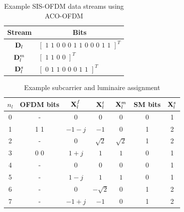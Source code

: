 \documentclass[12pt,letterpaper,onecolumn]{article} %
\newcommand{\vm}[1]{{\bf{#1}}}
\begin{document}
\setcounter{table}{0}
\newpage
\begin{table}[htp]
	\centering
		\begin{tabular}{|c|l|}
			\hline
			{\bf{Stream}}&\multicolumn{1}{|c|}{\bf{Bits}}\\
			\hline
			$\vm{D}_l$ & $\left[\text{ 1 1 0 0 0 1 1 0 0 0 1 1 }\right]^T $\\
			\hline
			$\vm{D}_l^m$ & $\left[\text{ 1 1 0 0 }\right]^T $\\
			\hline
			$\vm{D}_l^s$ & $\left[\text{ 0 1 1 0 0 0 1 1 }\right]^T $\\
			\hline
		\end{tabular}
	\caption{Example SIS-OFDM data streams using ACO-OFDM}
	\label{tabExBits}
\end{table}

\newpage
\begin{table}[htp]
	\centering
      \begin{tabular}{|c|c|c|c|c|c|c|}
			\hline
			{ $n_l$ }&{\bf{OFDM bits}}&$\vm{X}_l^f$&$\vm{X}^t_l$&$\vm{X}^m_l$&{\bf{SM bits}}&$\vm{X}^s_l$\\
			\hline
			0 & - & 0 & 0 & 0 &0 & 1\\
			\hline
			1 & 1 1 & $-1-j$ & $-1$ & 0 &1 & 2\\
			\hline
			2 & - & 0 & $\sqrt{2}$ & $\sqrt{2}$ &1 & 2\\
			\hline
			3 & 0 0 & $1+j$ & $1$ & $1$ & 0& 1\\
			\hline
			4 &-& 0 & 0 & 0 &0 & 1\\
			\hline
			5 &-& $1-j$ & $1$ & $1$ &0 & 1\\
			\hline
			6 &-& 0 & $-\sqrt{2}$ & 0 & 1& 2\\
			\hline
			7 &-& $-1+j$ & $-1$ & 0 &1 & 2\\
			\hline
		\end{tabular}
	\caption{Example subcarrier and luminaire assignment}
	\label{tabExample}
\end{table}
\end{document}
